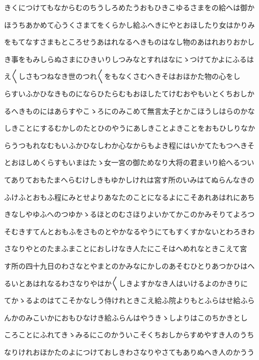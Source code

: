 \documentclass[a4paper,11pt,landscape]{ltjtarticle}
\begin{document}
\par\medskip
きくにつけてもなからむのちうしろめたうおもひきこゆるさまをの給へは御か
\par\medskip
ほうちあかめて心うくさまてをくらかし給ふへきにやとおほしたり女はかりみ
\par\medskip
をもてなすさまもところせうあはれなるへきものはなし物のあはれおりおかし
\par\medskip
き事をもみしらぬさまにひきいりしつみなとすれはなにゝつけてかよにふるは
\par\medskip
え〱しさもつねなき世のつれ〱をもなくさむへきそはおほかた物の心をし
\par\medskip
らすいふかひなきものにならひたらむもおほしたてけむおやもいとくちおしか
\par\medskip
るへきものにはあらすやこゝろにのみこめて無言太子とかこほうしはらのかな
\par\medskip
しきことにするむかしのたとひのやうにあしきことよきことをおもひしりなか
\par\medskip
らうつもれなむもいふかひなしわか心なからもよき程にはいかてたもつへきそ
\par\medskip
とおほしめくらすもいまはたゝ女一宮の御ためなり大将の君まいり給へるつい
\par\medskip
てありておもたまへらむけしきもゆかしけれは宮す所のいみはてぬらんなきの
\par\medskip
ふけふとおもふ程にみとせよりあなたのことになるよにこそあれあはれにあち
\par\medskip
きなしやゆふへのつゆかゝるほとのむさほりよいかてかこのかみそりてよろつ
\par\medskip
そむきすてんとおもふをさものとやかなるやうにてもすくすかないとわろきわ
\par\medskip
さなりやとのたまふまことにおしけなき人たにこそはへめれなときこえて宮
\par\medskip
す所の四十九日のわさなとやまとのかみなにかしのあそむひとりあつかひはへ
\par\medskip
るいとあはれなるわさなりやはか〱しきよすかなき人はいけるよのかきりに
\par\medskip
てかゝるよのはてこそかなしう侍けれときこえ給ふ院よりもとふらはせ給ふら
\par\medskip
んかのみこいかにおもひなけき給ふらんはやうきゝしよりはこのちかきとし
\par\medskip
ころことにふれてきゝみるにこのかういこそくちおしからすめやすき人のうち
\par\medskip
なりけれおほかたのよにつけておしきわさなりやさてもありぬへき人のかうう
\par\medskip
\end{document}
